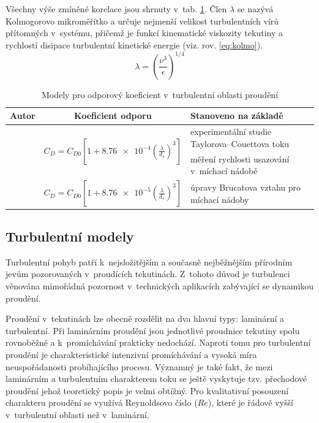 Všechny výše zmíněné korelace jsou shrnuty v~tab. \ref{tab:cds}. Člen $\lambda$ se nazývá Kolmogorovo mikroměřítko a určuje nejmenší velikost turbulentních vírů přítomných v~systému, přičemž je funkcí kinematické viskozity tekutiny a rychlostí disipace turbulentní kinetické energie (viz. rov. \ref{eq:kolmo}).
\begin{equation}
  \lambda = \left( \frac{\nu^{3}}{\epsilon} \right) ^{1/4}
	\label{eq:kolmo}
\end{equation}

\begin{table}[h!]
\centering
\caption{Modely pro odporový koeficient v~turbulentní oblasti proudění}
\label{tab:cds}
\begin{tabular}{cc>{\centering\arraybackslash}p{5cm}}
\toprule
\textbf{Autor} & \textbf{Koeficient odporu} & \textbf{Stanoveno na základě} \\
\midrule{}

\multirow{2}{*}{\citet{bru98}} & \multirow{2}{*}{$C_{D} = C_{D0} \left[ 1 + \num{8.76e-4} \left( \frac{\lambda}{d_{s}} \right)^{3} \right] $} & experimentální studie Taylorova–Couettova toku \\ \addlinespace

\multirow{2}{*}{\citet{pin01}} & \multirow{2}{*}{$C_{D} = C_{D0} \left[ \num{0.4}\tanh\left(  \frac{16\lambda}{d_{s}} - 1  \right) \right] ^{-2}$} & měření rychlosti usazování v~míchací nádobě \\ \addlinespace

\multirow{2}{*}{\citet{kho06}} & \multirow{2}{*}{$C_{D} = C_{D0} \left[ 1 + \num{8.76e-5} \left( \frac{\lambda}{d_{s}} \right)^{3} \right]$} & úpravy Brucatova vztahu pro míchací nádoby  \\

\bottomrule
\end{tabular}
\end{table}

\subsection{Turbulentní modely}
Turbulentní pohyb patří k~nejsložitějším a současně nejběžnějším přírodním jevům pozorovaných v~proudících tekutinách. Z~tohoto důvod je turbulenci věnována mimořádná pozornost v~technických aplikacích zabývající se dynamikou proudění. 

Proudění v~tekutinách lze obecně rozdělit na dva hlavní typy: laminární a turbulentní. Při laminárním proudění jsou jednotlivé proudnice tekutiny spolu rovnoběžné a k~promíchávání prakticky nedochází. Naproti tomu pro turbulentní proudění je charakteristické intenzivní promíchávání a vysoká míra neuspořádanosti probíhajícího procesu. Významný je také fakt, že mezi laminárním a turbulentním charakterem toku se ještě vyskytuje tzv. přechodové proudění jehož teoretický popis je velmi obtížný. Pro kvalitativní posouzení charakteru proudění se využívá Reynoldsovo číslo ($Re$), které je řádově vyšší v~turbulentní oblasti než v~laminární. 

